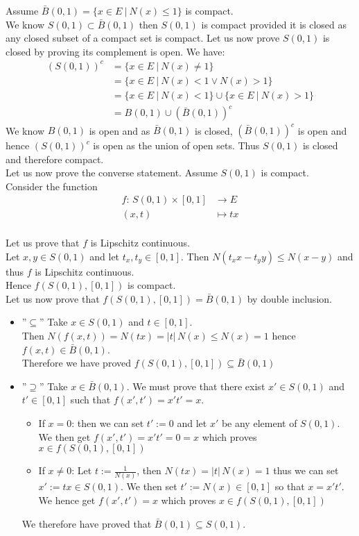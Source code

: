 \documentclass{article}
\begin{document}
\noindent Assume $\bar{B}(0,1) = \{ x \in E \ | \ N(x) \leq 1 \}$ is compact. \\
We know $S(0, 1) \subset \bar{B}(0,1)$ then $S(0,1)$ is compact provided it is closed as any closed subset of a compact set is compact. Let us now prove $S(0, 1)$ is closed by proving its complement is open. We have:
\begin{align*}
	(S(0,1))^c &= \{ x\in E \ | \ N(x) \neq 1 \} \\
	&=  \{ x\in E \ | \ N(x) < 1 \lor N(x) > 1 \} \\
	&= \{ x\in E \ | \ N(x) < 1 \} \cup \{ x\in E \ | \ N(x) > 1 \} \\
	&= B(0, 1) \cup (\bar{B}(0, 1))^c 
\end{align*}
We know $B(0,1)$ is open and as $\bar{B}(0, 1)$ is closed, $ (\bar{B}(0, 1))^c$ is open and hence $(S(0,1))^c$ is open as the union of open sets. Thus  $S(0, 1)$ is closed and therefore compact. \\

\noindent Let us now prove the converse statement. Assume $S(0, 1)$ is compact. \\

\noindent Consider the function 
\begin{align*} 
f  : \,  S(0,1) \times [0,1]  &\to  E \\
   (x,t)  &\mapsto  tx 
\end{align*} \\
Let us prove that $f$ is Lipschitz continuous. \\
Let $x, y \in S(0,1) $ and let $t_x, t_y \in [0,1]$. Then $N(t_xx-t_yy) \leq N(x-y)$ and thus $f$ is Lipschitz continuous. \\
Hence $f(S(0,1), [0,1])$ is compact. \\

\noindent Let us now prove that $f(S(0,1), [0,1]) = \bar{B}(0,1)$ by double inclusion.
\begin{itemize}
\item ''$\subseteq$'' 
Take $x \in S(0,1)$ and $t \in [0,1]$. \\
Then $N(f(x,t)) = N(tx) = |t| \, N(x) \leq N(x) = 1$ hence $f(x, t) \in \bar{B}(0,1)$. \\
 Therefore we have proved $f(S(0,1), [0,1]) \subseteq \bar{B}(0,1)$
\item ''$\supseteq$''
Take $x \in \bar{B}(0,1)$. We must prove that there exist $x' \in S(0,1)$ and $t' \in [0,1]$ such that $f(x', t') = x't' = x$. 
	\begin{itemize}
	\item If $x=0$:
	then we can set $t' :=0$ and let $x'$ be any element of $S(0,1)$. 
	We then get $f(x', t') = x't' = 0 = x$ which proves $x \in f(S(0,1), [0,1])$ 
	\item If $x \neq 0$:
	Let $t := \frac{1}{N(x)}$, then $N(tx) = |t| \, N(x) = 1$ thus we can set $x' := tx \in S(0,1)$. 
	We then set $t' := N(x) \in [0,1]$ so that $x = x't'$. 
	We hence get $f(x', t') = x$ which proves $x \in f(S(0,1), [0,1])$ 
	\end{itemize}
We therefore have proved that $\bar{B}(0,1) \subseteq S(0,1)$. 
\end{itemize}
\end{document}
